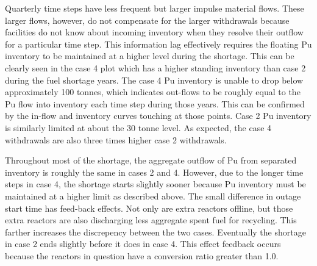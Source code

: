 \documentclass{style}
\begin{document}
Quarterly time steps have less frequent but larger impulse material flows.
These larger flows, however, do not compensate for the larger withdrawals
because facilities do not know about incoming inventory when they resolve
their outflow for a particular time step.  This information lag effectively
requires the floating Pu inventory to be maintained at a higher level during
the shortage.  This can be clearly seen in the case 4 plot which has a higher
standing inventory than case 2 during the fuel shortage years.  The case 4 Pu
inventory is unable to drop below approximately 100 tonnes, which indicates
out-flows to be roughly equal to the Pu flow into inventory each time step
during those years.  This can be confirmed by the in-flow and inventory curves
touching at those points.  Case 2 Pu inventory is similarly limited at about
the 30 tonne level.  As expected, the case 4 withdrawals are also three times
higher case 2 withdrawals.

Throughout most of the shortage, the aggregate outflow of Pu from separated
inventory is roughly the same in cases 2 and 4.  However, due to the longer
time steps in case 4, the shortage starts slightly sooner because Pu inventory
must be maintained at a higher limit as described above.  The small difference
in outage start time has feed-back effects.  Not only are extra reactors
offline, but those extra reactors are also discharging less aggregate spent
fuel for recycling.  This farther increases the discrepency between the two
cases. Eventually the shortage in case 2 ends slightly before it does in case
4. This effect feedback occurs because the reactors in question have a
conversion ratio greater than 1.0.
\end{document}
